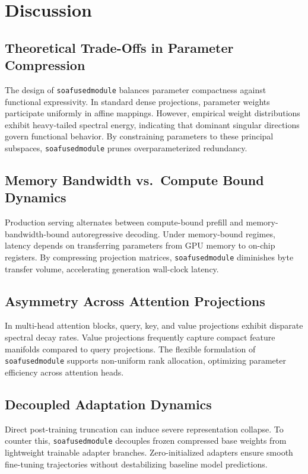 \section{Discussion}

\subsection{Theoretical Trade-Offs in Parameter Compression}
The design of \texttt{soafusedmodule} balances parameter compactness against functional expressivity. In standard dense projections, parameter weights participate uniformly in affine mappings. However, empirical weight distributions exhibit heavy-tailed spectral energy, indicating that dominant singular directions govern functional behavior. By constraining parameters to these principal subspaces, \texttt{soafusedmodule} prunes overparameterized redundancy.

\subsection{Memory Bandwidth vs.\ Compute Bound Dynamics}
Production serving alternates between compute-bound prefill and memory-bandwidth-bound autoregressive decoding. Under memory-bound regimes, latency depends on transferring parameters from GPU memory to on-chip registers. By compressing projection matrices, \texttt{soafusedmodule} diminishes byte transfer volume, accelerating generation wall-clock latency.

\subsection{Asymmetry Across Attention Projections}
In multi-head attention blocks, query, key, and value projections exhibit disparate spectral decay rates. Value projections frequently capture compact feature manifolds compared to query projections. The flexible formulation of \texttt{soafusedmodule} supports non-uniform rank allocation, optimizing parameter efficiency across attention heads.

\subsection{Decoupled Adaptation Dynamics}
Direct post-training truncation can induce severe representation collapse. To counter this, \texttt{soafusedmodule} decouples frozen compressed base weights from lightweight trainable adapter branches. Zero-initialized adapters ensure smooth fine-tuning trajectories without destabilizing baseline model predictions.

